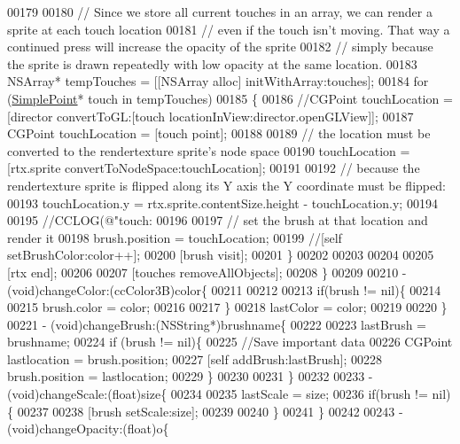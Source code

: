 \begin{DoxyCode}
00179 
00180     \textcolor{comment}{// Since we store all current touches in an array, we can render a sprite at each touch location}
00181     \textcolor{comment}{// even if the touch isn't moving. That way a continued press will increase the opacity of the sprite}
00182     \textcolor{comment}{// simply because the sprite is drawn repeatedly with low opacity at the same location.}
00183     NSArray* tempTouches = [[NSArray alloc] initWithArray:touches];
00184     \textcolor{keywordflow}{for} (\hyperlink{interface_simple_point}{SimplePoint}* touch in tempTouches)
00185     \{
00186         \textcolor{comment}{//CGPoint touchLocation = [director convertToGL:[touch locationInView:director.openGLView]];}
00187         CGPoint touchLocation = [touch point];
00188         
00189         \textcolor{comment}{// the location must be converted to the rendertexture sprite's node space}
00190         touchLocation = [rtx.sprite convertToNodeSpace:touchLocation];
00191         
00192         \textcolor{comment}{// because the rendertexture sprite is flipped along its Y axis the Y coordinate must be flipped:}
00193         touchLocation.y = rtx.sprite.contentSize.height - touchLocation.y;
00194         
00195         \textcolor{comment}{//CCLOG(@"touch: %
00196         
00197         \textcolor{comment}{// set the brush at that location and render it}
00198         brush.position = touchLocation;
00199         \textcolor{comment}{//[self setBrushColor:color++];}
00200         [brush visit];
00201     \}
00202     
00203     
00204     
00205     [rtx end];
00206     
00207     [touches removeAllObjects];
00208 \}
00209 
00210 - (void)changeColor:(ccColor3B)color\{
00211     
00212        
00213     \textcolor{keywordflow}{if}(brush != nil)\{
00214         
00215         brush.color = color;
00216      
00217     \}
00218     lastColor = color;
00219     
00220 \}
00221 - (void)changeBrush:(NSString*)brushname\{
00222     
00223     lastBrush = brushname;
00224     \textcolor{keywordflow}{if} (brush != nil)\{
00225         \textcolor{comment}{//Save important data}
00226         CGPoint lastlocation = brush.position;
00227         [\textcolor{keyword}{self} addBrush:lastBrush];
00228         brush.position = lastlocation;
00229     \}
00230     
00231 \}
00232 
00233 - (void)changeScale:(\textcolor{keywordtype}{float})size\{
00234     
00235     lastScale = size;
00236     \textcolor{keywordflow}{if}(brush != nil)\{
00237         
00238         [brush setScale:size];
00239         
00240     \}
00241 \}
00242 
00243 - (void)changeOpacity:(\textcolor{keywordtype}{float})o\{
}
\end{DoxyCode}
